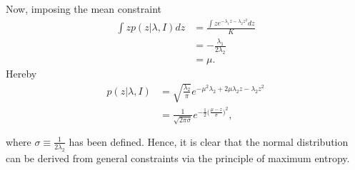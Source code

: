 \begin{example}
		Now, imposing the mean constraint
		\begin{equation}
			\begin{split}
				\int zp(z|\lambda,I) dz &= \frac{\int ze^{-\lambda_1z-\lambda_2z^2}dz}{K}\\
				&= -\frac{\lambda_1}{2\lambda_2}\\
				&=\mu.
			\end{split}
		\end{equation}
		Hereby
		\begin{equation}
			\begin{split}
				p(z|\lambda,I) &= \sqrt{\frac{\lambda_2}{\pi}}e^{-\mu^2\lambda_2+2\mu \lambda_2z-\lambda_2z^2}\\
				&= \frac{1}{\sqrt{2\pi\sigma}}e^{-\frac{1}{2}\big(\frac{\mu-z}{\sigma}\big)^2},\\\\
			\end{split}
		\end{equation}
		where $\sigma\equiv \frac{1}{2\lambda_2}$ has been defined. Hence, it is clear that the normal distribution can be derived from general constraints via the principle of maximum entropy.
	\end{example}
	
